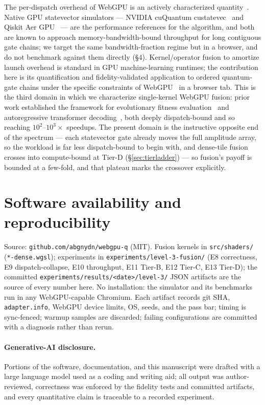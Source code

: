\documentclass[11pt]{article}
\begin{document}
The per-dispatch overhead of WebGPU is an actively characterized
quantity~\cite{webgpudispatch}. Native GPU statevector simulators --- NVIDIA
cuQuantum custatevec~\cite{cuquantum} and Qiskit Aer GPU~\cite{qiskit} --- are
the performance references for the algorithm, and both are known to approach
memory-bandwidth-bound throughput for long contiguous gate chains; we target
the same bandwidth-fraction regime but in a browser, and do not benchmark
against them directly (\S4). Kernel/operator fusion to amortize launch overhead
is standard in GPU machine-learning runtimes; the contribution here is its
quantification and fidelity-validated application to ordered quantum-gate
chains under the specific constraints of WebGPU~\cite{webgpuspec} in a browser
tab. This is the third domain in which we characterize single-kernel WebGPU
fusion: prior work established the framework for evolutionary fitness
evaluation~\cite{fusionfitness} and autoregressive transformer
decoding~\cite{fusiontransformer}, both deeply dispatch-bound and so reaching
$10^2$--$10^3\times$ speedups. The present domain is the instructive opposite
end of the spectrum --- each statevector gate already moves the full amplitude
array, so the workload is far less dispatch-bound to begin with, and dense-tile
fusion crosses into compute-bound at Tier-D (\S\ref{sec:tierladder}) --- so
fusion's payoff is bounded at a few-fold, and that plateau marks the crossover
explicitly.

\section{Software availability and reproducibility}

Source: \texttt{github.com/abgnydn/webgpu-q} (MIT). Fusion kernels in
\texttt{src/shaders/} (\texttt{*-dense.wgsl}); experiments in
\texttt{experiments/level-3-fusion/} (E8 correctness, E9 dispatch-collapse, E10
throughput, E11 Tier-B, E12 Tier-C, E13 Tier-D); the committed
\texttt{experiments/results/<date>/level-3/} JSON artifacts are the source of
every number here. No installation: the simulator and its benchmarks run in any
WebGPU-capable Chromium. Each artifact records git SHA, \texttt{adapter.info},
WebGPU device limits, OS, seeds, and the pass bar; timing is sync-fenced;
warmup samples are discarded; failing configurations are committed with a
diagnosis rather than rerun.

\paragraph{Generative-AI disclosure.} Portions of the software, documentation,
and this manuscript were drafted with a large language model used as a coding
and writing aid; all output was author-reviewed, correctness was enforced by
the fidelity tests and committed artifacts, and every quantitative claim is
traceable to a recorded experiment.
\end{document}
